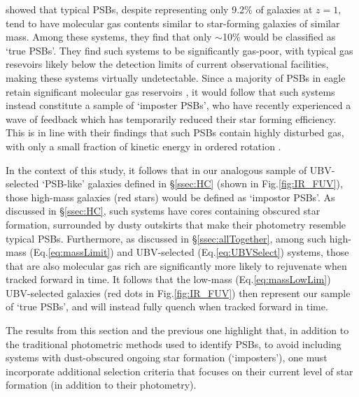 \documentclass[twocolumn, linenumbers]{aastex631}
\newcommand{\eq}{Eq.\hspace{.2em}}
\renewcommand{\fig}{Fig.\hspace{.2em}}
\newcommand{\eagle}[0]{{\sc eagle} }
\begin{document}
\cenci showed that typical PSBs, despite representing only 9.2\% of galaxies at $z=1$, tend to have molecular gas contents similar to star-forming galaxies of similar mass.  Among these systems, they find that only $\sim$10\% would be classified as `true PSBs'.  They find such systems to be significantly gas-poor, with typical gas resevoirs likely below the detection limits of current observational facilities, making these systems virtually undetectable.  Since a majority of PSBs in \eagle retain significant molecular gas reservoirs \citep{psbEagle}, it would follow that such systems instead constitute a sample of `imposter PSBs', who have recently experienced a wave of feedback which has temporarily reduced their star forming efficiency.  This is in line with their findings that such PSBs contain highly disturbed gas, with only a small fraction of kinetic energy in ordered rotation \citep{psbEagle}.


In the context of this study, it follows that in our analogous sample of UBV-selected `PSB-like' galaxies defined in \S\ref{ssec:HC} (shown in \fig \ref{fig:IR_FUV}), those high-mass galaxies (red stars) would be defined as `impostor PSBs'.  As discussed in \S\ref{ssec:HC}, such systems have cores containing obscured star formation, surrounded by dusty outskirts that make their photometry resemble typical PSBs. Furthermore, as discussed in \S\ref{ssec:allTogether}, among such high-mass (\eq\ref{eq:massLimit}) and UBV-selected (\eq\ref{eq:UBVSelect}) systems, those that are also molecular gas rich are significantly more likely to rejuvenate when tracked forward in time.  It follows that the low-mass (\eq\ref{eq:massLowLim}) UBV-selected galaxies (red dots in \fig \ref{fig:IR_FUV}) then represent our sample of `true PSBs', and will instead fully quench when tracked forward in time.  

The results from this section and the previous one highlight that, in addition to the traditional photometric methods used to identify PSBs, to avoid including systems with dust-obscured ongoing star formation (`imposters'), one must incorporate additional selection criteria that focuses on their current level of star formation (in addition to their photometry).
\end{document}

